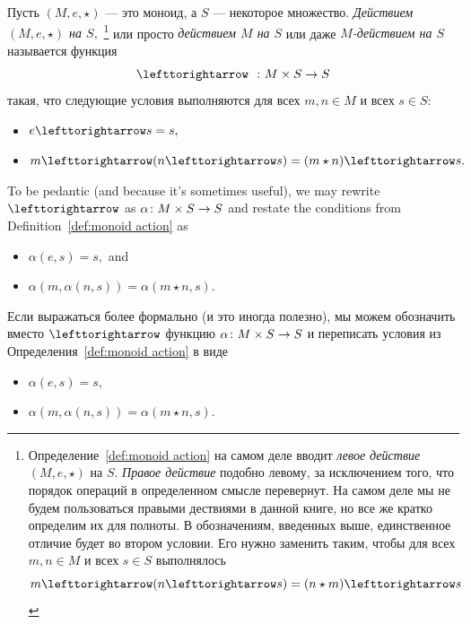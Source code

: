 \documentclass[../main/CT4S-EN-RU]{subfiles}
\begin{document}
\begin{definitionRUS}\label{def:monoid action}
Пусть $(M,e,\star)$ — это моноид, а $S$ — некоторое множество. {\em Действием $(M,e,\star)$ на $S,$}%
\footnote{Определение~\ref{def:monoid action} на самом деле вводит {\em левое действие} $(M,e,\star)$ на $S.$ {\em Правое действие} подобно левому, за исключением того, что порядок операций в определенном смысле перевернут. На самом деле мы не будем пользоваться правыми дествиями в данной книге, но все же кратко определим их для полноты. В обозначениям, введенных выше, единственное отличие будет во втором условии. Его нужно заменить таким, чтобы для всех $m,n\in M$ и всех $s\in S$ выполнялось
$$m\acts(n\acts s)=(n\star m)\acts s$$}
или просто {\em действием $M$ на $S$} или даже {\em $M$-действием на $S$} называется функция $$\acts\;\;\taking M\times S\to S$$ такая, что следующие условия выполняются для всех $m,n\in M$ и всех $s\in S$:
\begin{itemize}
\item $e\acts s=s,$
\item $m\acts(n\acts s)=(m\star n)\acts s.$
\end{itemize}
\end{definitionRUS}

\begin{remarkENG}\label{rmk:monoid action}
To be pedantic (and because it's sometimes useful), we may rewrite $\acts$ as $\alpha\colon M\times S\rightarrow S$ and restate the conditions from Definition~\ref{def:monoid action} as
\begin{itemize}
\item $\alpha(e,s)=s,$ and
\item $\alpha(m,\alpha(n,s))=\alpha(m\star n,s).$
\end{itemize}
\end{remarkENG}

\begin{remarkRUS}\label{rmk:monoid action}
Если выражаться более формально (и это иногда полезно), мы можем обозначить вместо $\acts$ функцию $\alpha\colon M\times S\rightarrow S$ и переписать условия из Определения~\ref{def:monoid action} в виде
\begin{itemize}
\item $\alpha(e,s)=s,$
\item $\alpha(m,\alpha(n,s))=\alpha(m\star n,s).$
\end{itemize}
\end{remarkRUS}
\end{document}
